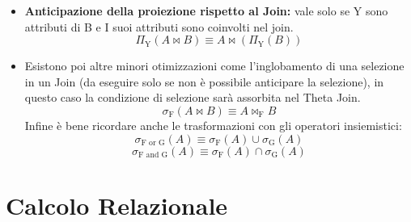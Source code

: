 \documentclass{report}
\begin{document}
\begin{itemize}
    \item \textbf{Anticipazione della proiezione rispetto al Join:} vale solo se Y sono attributi di B e I suoi attributi sono coinvolti nel join.\\
$$\Pi_\text{Y}(A \bowtie B) \equiv A \bowtie(\Pi_\text{Y}(B))$$
\newpage
    \item Esistono poi altre minori otimizzazioni come l'inglobamento di una selezione in un Join (da eseguire solo se non è possibile anticipare la selezione), in questo caso la condizione di selezione sarà assorbita nel Theta Join.\\
$$\sigma_\text{F}(A \bowtie B) \equiv A \bowtie_\text{F} B$$
    Infine è bene ricordare anche le trasformazioni con gli operatori insiemistici:\\
$$\sigma_\text{F or G}(A) \equiv \sigma_\text{F}(A) \cup \sigma_\text{G}(A)$$
$$\sigma_\text{F and G}(A) \equiv \sigma_\text{F}(A) \cap \sigma_\text{G}(A)$$
    
\end{itemize}



\newpage
\chapter{Calcolo Relazionale}
\end{document}
